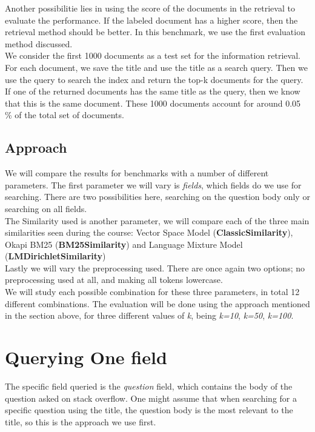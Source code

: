 \documentclass{article}
\begin{document}
Another possibilitie lies in using the score of the documents in the retrieval to evaluate the performance. If the labeled document has a higher score, then the retrieval method should be better. In this benchmark, we use the first evaluation method discussed.\\

We consider the first 1000 documents as a test set for the information retrieval. For each document, we save the title and use the title as a search query. Then we use the query to search the index and return the top-k documents for the query. If one of the returned documents has the same title as the query, then we know that this is the same document. These 1000 documents account for around 0.05 \% of the total set of documents.

\subsection{Approach}
We will compare the results for benchmarks with a number of different parameters. The first parameter we will vary is \textit{fields}, which fields do we use for searching. There are two possibilities here, searching on the question body only or searching on all fields.\\

The Similarity used is another parameter, we will compare each of the three main similarities seen during the course: Vector Space Model (\textbf{ClassicSimilarity}), Okapi BM25 (\textbf{BM25Similarity}) and Language Mixture Model (\textbf{LMDirichletSimilarity})\\

Lastly we will vary the preprocessing used. There are once again two options; no preprocessing used at all, and making all tokens lowercase.\\

We will study each possible combination for these three parameters, in total 12 different combinations. The evaluation will be done using the approach mentioned in the section above, for three different values of \textit{k}, being \textit{k=10}, \textit{k=50}, \textit{k=100}.

\section{Querying One field}
The specific field queried is the \textit{question} field, which contains the body of the question asked on stack overflow. One might assume that when searching for a specific question using the title, the question body is the most relevant to the title, so this is the approach we use first.
\end{document}
